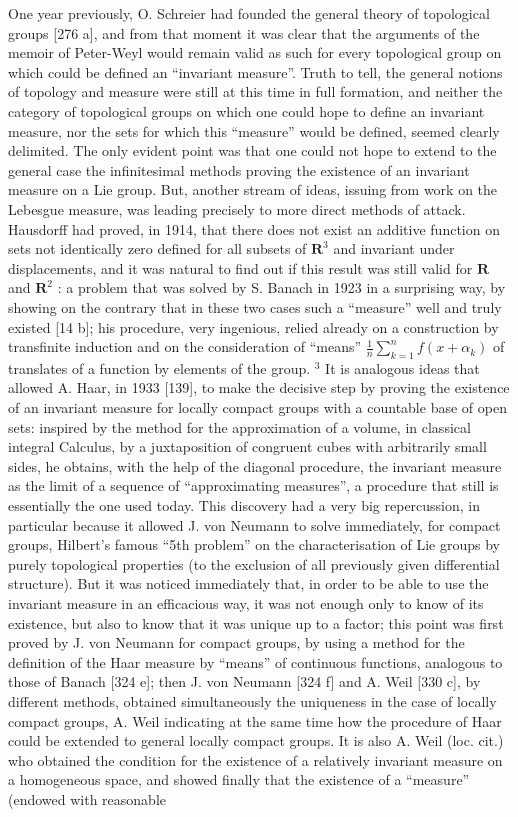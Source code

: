 One year previously, O. Schreier had founded the general theory of topological groups {[}276 a{]}, and from that moment it was clear that the arguments of the memoir of Peter-Weyl would remain valid as such for every topological group on which could be defined an ``invariant measure''. Truth to tell, the general notions of topology and measure were still at this time in full formation, and neither the category of topological groups on which one could hope to define an invariant measure, nor the sets for which this ``measure'' would be defined, seemed clearly delimited. The only evident point was that one could not hope to extend to the general case the infinitesimal methods proving the existence of an invariant measure on a Lie group. But, another stream of ideas, issuing from work on the Lebesgue measure, was leading precisely to more direct methods of attack. Hausdorff had proved, in 1914, that there does not exist an additive function on sets not identically zero defined for all subsets of \(\mathbf{R}^3\) and invariant under displacements, and it was natural to find out if this result was still valid for \(\mathbf{R}\) and \(\mathbf{R}^2\) : a problem that was solved by S. Banach in 1923 in a surprising way, by showing on the contrary that in these two cases such a ``measure'' well and truly existed {[}14 b{]}; his procedure, very ingenious, relied already on a construction by transfinite induction and on the consideration of ``means'' \(\frac{1}{n} \sum_{k=1}^{n} f(x + \alpha_k)\) of translates of a function by elements of the group. \(^3\) It is analogous ideas that allowed A. Haar, in 1933 {[}139{]}, to make the decisive step by proving the existence of an invariant measure for locally compact groups with a countable base of open sets: inspired by the method for the approximation of a volume, in classical integral Calculus, by a juxtaposition of congruent cubes with arbitrarily small sides, he obtains, with the help of the diagonal procedure, the invariant measure as the limit of a sequence of ``approximating measures'', a procedure that still is essentially the one used today. This discovery had a very big repercussion, in particular because it allowed J. von Neumann to solve immediately, for compact groups, Hilbert's famous ``5th problem'' on the characterisation of Lie groups by purely topological properties (to the exclusion of all previously given differential structure). But it was noticed immediately that, in order to be able to use the invariant measure in an efficacious way, it was not enough only to know of its existence, but also to know that it was unique up to a factor; this point was first proved by J. von Neumann for compact groups, by using a method for the definition of the Haar measure by ``means'' of continuous functions, analogous to those of Banach {[}324 e{]}; then J. von Neumann {[}324 f{]} and A. Weil {[}330 c{]}, by different methods, obtained simultaneously the uniqueness in the case of locally compact groups, A. Weil indicating at the same time how the procedure of Haar could be extended to general locally compact groups. It is also A. Weil (loc. cit.) who obtained the condition for the existence of a relatively invariant measure on a homogeneous space, and showed finally that the existence of a ``measure'' (endowed with reasonable 